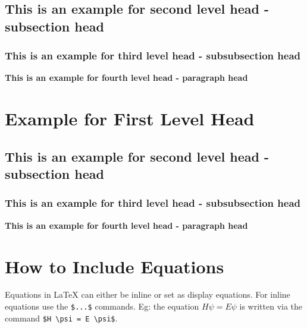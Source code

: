 \documentclass[12pt,a4paper]{article}
\newcommand{\subsubsubsection}[1]{%
  \vspace{\baselineskip}%
  \noindent\textbf{#1\\}\quad%
}
\begin{document}
\subsection{This is an example for second level head - subsection head}\label{subsec1}
\lipsum[5]

\subsubsection{This is an example for third level head - subsubsection head}\label{subsubsec1}
\lipsum[6]

\subsubsubsection{This is an example for fourth level head - paragraph head}
\lipsum[7]


\section{Example for First Level Head}\label{sec3}

\subsection{This is an example for second level head - subsection head}\label{subsec2}

\subsubsection{This is an example for third level head - subsubsection head}\label{subsubsec2}
\lipsum[8]

\subsubsubsection{This is an example for fourth level head - paragraph head}
\lipsum[9]


\section{How to Include Equations}\label{sec4}

Equations in \LaTeX{} can either be inline or set as display equations. For
inline equations use the \verb+$...$+ commands. Eg: the equation
$H\psi = E \psi$ is written via the command \verb+$H \psi = E \psi$+.
\end{document}
